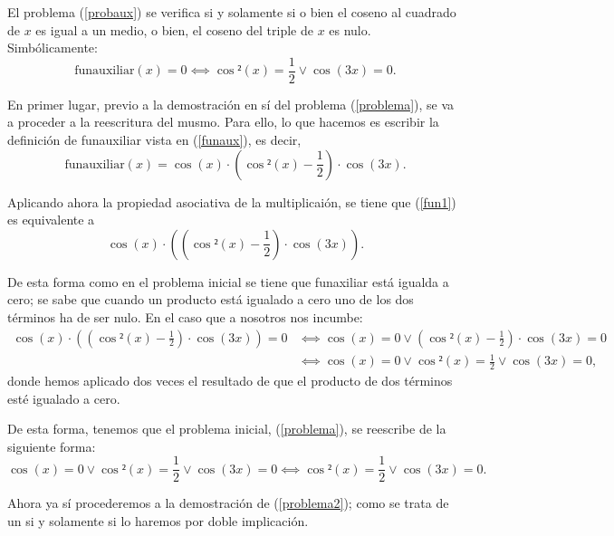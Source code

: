 \begin{lema}[CasosSolucion]El problema (\ref{probaux}) se verifica
  si y solamente si o bien el coseno al cuadrado de \(x\) es igual
  a un medio, o bien, el coseno del triple de \(x\) es nulo.
  Simbólicamente:
  \begin{equation}\label{problema}
    \text{funauxiliar}(x)=0 ⟺ \cos²(x)=\frac{1}{2} \lor
    \cos(3x)=0.
  \end{equation}
  \end{lema}
\begin{demostracion}
  En primer lugar, previo a la demostración en sí del problema
  (\ref{problema}), se va a proceder a la reescritura del musmo.
  Para ello, lo que hacemos es escribir la definición de
  funauxiliar vista en (\ref{funaux}), es decir,
  \begin{equation}\label{fun1}
    \text{funauxiliar}(x)=\cos(x)·(\cos²(x)-\frac{1}{2})·\cos(3x).
  \end{equation}

  Aplicando ahora la propiedad asociativa de la multiplicaión,
  se tiene que (\ref{fun1}) es equivalente a
  \begin{equation}\label{fun2}
    \cos(x)·((\cos²(x)-\frac{1}{2})·\cos(3x)).
  \end{equation}

  De esta forma como en el problema inicial se tiene que funaxiliar
  está igualda a cero; se sabe que cuando un producto está igualado
  a cero uno de los dos términos ha de ser nulo. En el caso que a
  nosotros nos incumbe:
  \begin{align}
    \cos(x)·((\cos²(x)-\frac{1}{2})·\cos(3x))=0 &⟺ \cos(x)=0
                                                  \lor (\cos²(x)-
                                                  \frac{1}{2})·
                                                  \cos(3x)=0 \\
    & ⟺ \cos(x)=0 \lor \cos²(x)=\frac{1}{2} \lor \cos(3x)=0,
  \end{align}
  donde hemos aplicado dos veces el resultado de que el producto
  de dos términos esté igualado a cero.

  De esta forma, tenemos que el problema inicial, (\ref{problema}),
  se reescribe de la siguiente forma:
  \begin{equation}\label{problema2}
    \cos(x)=0 \lor \cos²(x)=\frac{1}{2} \lor \cos(3x)=0
    ⟺ \cos²(x)=\frac{1}{2} \lor \cos(3x)=0.
  \end{equation}

  Ahora ya sí procederemos a la demostración de (\ref{problema2});
  como se trata de un si y solamente si lo haremos por doble
  implicación.


\end{demostracion}
